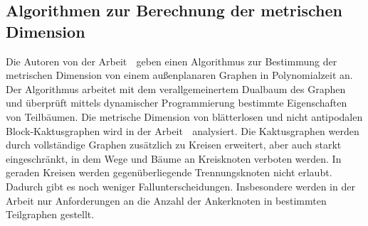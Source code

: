 \subsection{Algorithmen zur Berechnung der metrischen Dimension}
\vspace{-2mm}
Die Autoren von der Arbeit \grqq$\;$\cite{aussenplanar} geben einen Algorithmus zur Bestimmung der metrischen Dimension von einem außenplanaren Graphen in Polynomialzeit an. Der Algorithmus arbeitet mit dem verallgemeinertem Dualbaum des Graphen und überprüft mittels dynamischer Programmierung bestimmte Eigenschaften von Teilbäumen. 
\vspace{-1mm}
\newline\newline
Die metrische Dimension von blätterlosen und nicht antipodalen Block-Kaktusgraphen wird in der Arbeit \grqq$\;$\cite{cactusblock} analysiert. Die Kaktusgraphen werden durch vollständige Graphen zusätzlich zu Kreisen erweitert, aber auch starkt eingeschränkt, in dem Wege und Bäume an Kreisknoten verboten werden. In geraden Kreisen werden gegenüberliegende Trennungsknoten nicht erlaubt. Dadurch gibt es noch weniger Fallunterscheidungen. Insbesondere werden in der Arbeit nur Anforderungen an die Anzahl der Ankerknoten in bestimmten Teilgraphen gestellt.
\vspace{-5mm}
